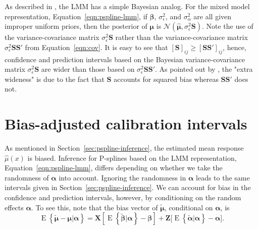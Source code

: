\documentclass[cmfont,usenames,dvipsnames,leqno]{afit-etd}\usepackage[]{graphicx}\usepackage[]{color}
\newcommand{\mc}[1]{\ensuremath{\mathcal{#1}}}
\newcommand{\wh}[1]{\ensuremath{\widehat{#1}}}
\newcommand{\wt}[1]{\ensuremath{\widetilde{#1}}}
\newcommand{\E}{\operatorname{E}}
\begin{document}
As described in \citet{robinson_that_1991}, the \ac{LMM} has a simple Bayesian analog. For the mixed model representation, Equation~\eqref{eqn:pspline-lmm}, if $\bm{\beta}$, $\sigma_\epsilon^2$, and $\sigma_\alpha^2$ are all given improper uniform priors, then the posterior of $\bm{\mu}$ is $\mc{N}\left( \wh{\bm{\mu}}, \sigma_\epsilon^2 \bm{S} \right)$. Note the use of the variance-covariance matrix $\sigma_\epsilon^2\bm{S}$ rather than the variance-covariance matrix $\sigma_\epsilon^2\bm{S}\bm{S}'$ from Equation~\eqref{eqn:cov}. It is easy to see that $\left[\bm{S}\right]_{ij} \ge \left[\bm{S}\bm{S}'\right]_{ij}$, hence, confidence and prediction intervals based on the Bayesian variance-covariance matrix $\sigma_\epsilon^2\bm{S}$ are wider than those based on $\sigma_\epsilon^2\bm{S}\bm{S}'$. As pointed out by \citet{hastie_gams_1990}, the "extra wideness" is due to the fact that $\bm{S}$ accounts for squared bias whereas $\bm{S}\bm{S}'$ does not.

\section{Bias-adjusted calibration intervals}
\label{sec:adjusted-calibration}
As mentioned in Section~\ref{sec:pspline-inference}, the estimated mean response $\wh{\mu}(x)$ is biased. Inference for \ac{P-spline}s based on the \ac{LMM} representation, Equation~\eqref{eqn:pspline-lmm}, differs depending on whether we take the randomness of $\bm{\alpha}$ into account. Ignoring the randomness in $\bm{\alpha}$ leads to the same intervals given in Section~\ref{sec:pspline-inference}. We can account for bias in the confidence and prediction intervals, however, by conditioning on the random effects $\bm{\alpha}$. To see this, note that the bias vector of $\wt{\bm{\mu}}$, conditional on $\bm{\alpha}$, is 
\begin{equation}
\label{eqn:conditional-bias}
  \E\left\{\wt{\bm{\mu}} - \bm{\mu} | \bm{\alpha}\right\} = \bm{X}\left[ \E\left\{\wt{\bm{\beta}} | \bm{\alpha}\right\} - \bm{\beta} \right] + \bm{Z}\Big[ \E\left\{\wt{\bm{\alpha}} | \bm{\alpha}\right\} - \bm{\alpha} \Big].
\end{equation}
\end{document}
